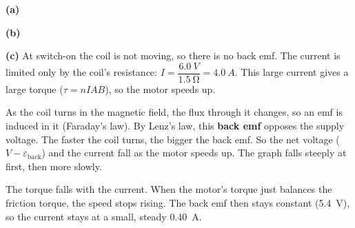 \begin{practiceanswers}
\begin{practiceans}
  \textbf{(a)}

  \textbf{(b)}

  \begin{modelanswer}
  \textbf{(c)} At switch-on the coil is not moving, so there is no back emf. The current is
  limited only by the coil's resistance: $I = \dfrac{\qty{6.0}{V}}{\qty{1.5}{\ohm}} =
  \qty{4.0}{A}$. This large current gives a large torque ($\tau = nIAB$), so the motor speeds
  up.

  As the coil turns in the magnetic field, the flux through it changes, so an emf is induced
  in it (Faraday's law). By Lenz's law, this \textbf{back emf} opposes the supply voltage. The
  faster the coil turns, the bigger the back emf. So the net voltage
  ($V - \varepsilon_\mathrm{back}$) and the current fall as the motor speeds up. The graph
  falls steeply at first, then more slowly.

  The torque falls with the current. When the motor's torque just balances the friction
  torque, the speed stops rising. The back emf then stays constant (\qty{5.4}{V}), so the
  current stays at a small, steady \qty{0.40}{A}.


\end{modelanswer}
\end{practiceans}
\end{practiceanswers}
